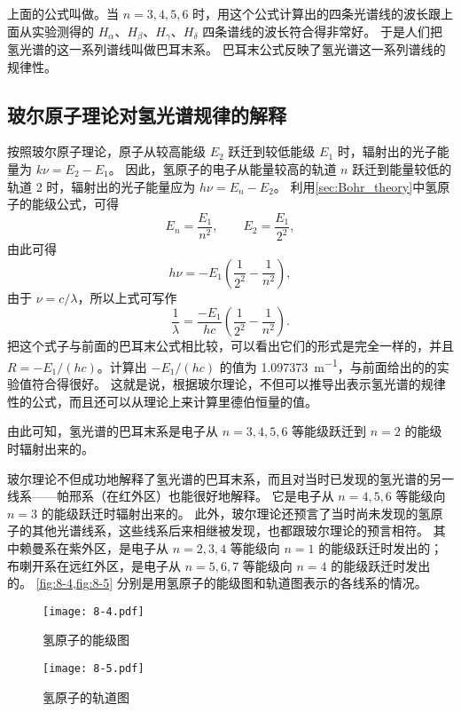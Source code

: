 上面的公式叫做。当 $n=3,4,5,6$ 时，用这个公式计算出的四条光谱线的波长跟上面从实验测得的 $H_{\alpha}$、$H_{\beta}$、$H_{\gamma}$、$H_{\delta}$ 四条谱线的波长符合得非常好。
于是人们把氢光谱的这一系列谱线叫做巴耳末系。
巴耳末公式反映了氢光谱这一系列谱线的规律性。

\subsection{玻尔原子理论对氢光谱规律的解释} 

按照玻尔原子理论，原子从较高能级 $E_2$ 跃迁到较低能级 $E_1$ 时，辐射出的光子能量为 $k\nu =E_2-E_1$。
因此，氢原子的电子从能量较高的轨道 $n$ 跃迁到能量较低的轨道 2 时，辐射出的光子能量应为 $h\nu=E_n-E_2$。
利用\cref{sec:Bohr_theory}中氢原子的能级公式，可得
\[E_n=\frac{E_1}{n^2},\qquad E_2=\frac{E_1}{2^2},\]
由此可得
\[h\nu=-E_1\left( \frac{1}{2^2}-\frac{1}{n^2}\right),\]
由于 $\nu=c/\lambda$，所以上式可写作
\[\frac{1}{\lambda}=\frac{-E_1}{hc}\left( \frac{1}{2^2}-\frac{1}{n^2}\right).\]
把这个式子与前面的巴耳末公式相比较，可以看出它们的形式是完全一样的，并且 $R=-E_1/(hc)$。计算出 $-E_1/(hc)$ 的值为 \qty{1.097373}{m^{-1}}，与前面给出的的实验值符合得很好。
这就是说，根据玻尔理论，不但可以推导出表示氢光谱的规律性的公式，而且还可以从理论上来计算里德伯恒量的值。

由此可知，氢光谱的巴耳末系是电子从 $n=3,4,5,6$ 等能级跃迁到 $n=2$ 的能级时辐射出来的。

玻尔理论不但成功地解释了氢光谱的巴耳末系，而且对当时已发现的氢光谱的另一线系——帕邢系（在红外区）也能很好地解释。
它是电子从 $n=4,5,6$ 等能级向 $n=3$ 的能级跃迁时辐射出来的。
此外，玻尔理论还预言了当时尚未发现的氢原子的其他光谱线系，这些线系后来相继被发现，也都跟玻尔理论的预言相符。
其中赖曼系在紫外区，是电子从 $n=2,3,4$ 等能级向 $n=1$ 的能级跃迁时发出的；布喇开系在远红外区，是电子从 $n=5,6,7$ 等能级向 $n=4$ 的能级跃迁时发出的。
\cref{fig:8-4,fig:8-5} 分别是用氢原子的能级图和轨道图表示的各线系的情况。
\begin{figure}
\texttt{[image: 8-4.pdf]}
    \caption{氢原子的能级图}\label{fig:8-4}
\end{figure}

\begin{figure}
  \texttt{[image: 8-5.pdf]}
  \caption{氢原子的轨道图}\label{fig:8-5}
\end{figure}

